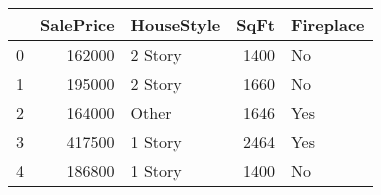 \begin{tabular}{lrlrl}
\toprule
{} &  SalePrice & HouseStyle &  SqFt & Fireplace \\
\midrule
0 &     162000 &    2 Story &  1400 &        No \\
1 &     195000 &    2 Story &  1660 &        No \\
2 &     164000 &      Other &  1646 &       Yes \\
3 &     417500 &    1 Story &  2464 &       Yes \\
4 &     186800 &    1 Story &  1400 &        No \\
\bottomrule
\end{tabular}
